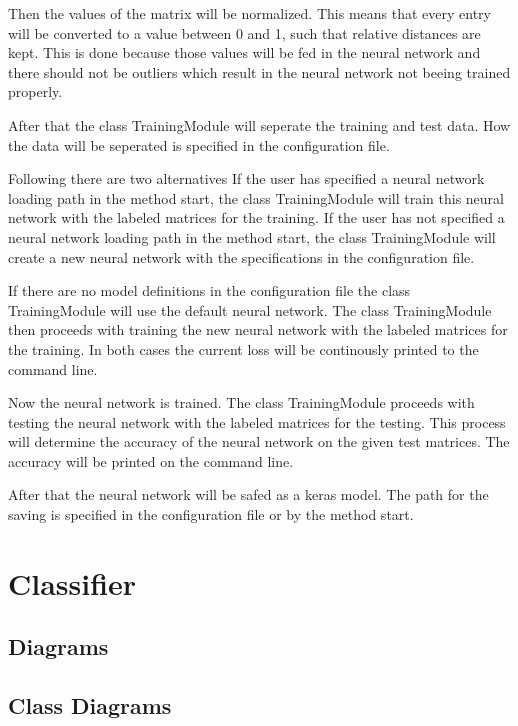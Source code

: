 \documentclass[parskip=full]{scrartcl}
\begin{document}
Then the values of the matrix will be normalized. This means that every entry will be converted to a value between 0 and 1, such that relative distances are kept. This is done because those values will be fed in the neural network and there should not be outliers which result in the neural network not beeing trained properly.

After that the class TrainingModule will seperate the training and test data.
How the data will be seperated is specified in the configuration file.\newline

Following there are two alternatives
 If the user has specified a neural network loading path in the method start, the class TrainingModule will train this neural network with the labeled matrices for the training.
If the user has not specified a neural network  loading path in the method start, the class TrainingModule will create a new neural network with the specifications in the configuration file.\newline

If there are no model definitions in the configuration file the class TrainingModule will use the \gls{default neural network}.
The class TrainingModule then proceeds with training the new neural network with the labeled matrices for the training. In both cases the current loss will be continously printed to the command line.\newline

Now the neural network is trained. The class TrainingModule proceeds with testing the neural network with the labeled matrices for the testing.
This process will determine the accuracy of the neural network on the given test matrices.
The accuracy will be printed on the command line.\newline

After that the neural network will be safed as a keras model.
The path for the saving is specified in the configuration file or by the method start.


\newpage
\section{Classifier}

\subsection{Diagrams}

\subsection{Class Diagrams}
\end{document}
